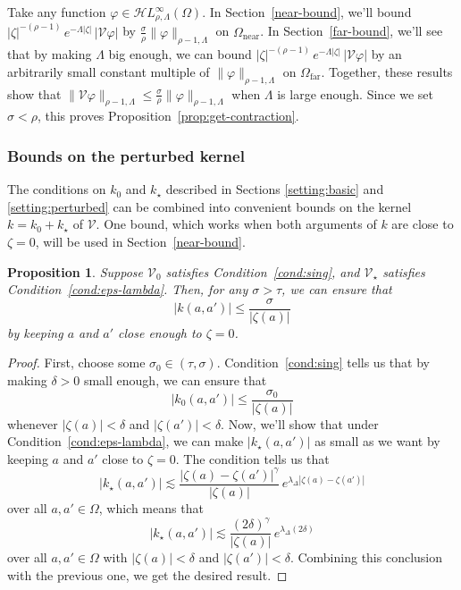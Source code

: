 \documentclass{article}
\theoremstyle{definition}
\theoremstyle{plain}
\newtheorem{prop}{Proposition}
\newcommand{\singexp}[2]{\mathcal{H}L^\infty_{#1, #2}}
\newcommand{\volterra}{\mathcal{V}}
\newcommand{\hardpart}{\mathcal{V}_0}
\newcommand{\softpart}{\mathcal{V}_\star}
\newcommand{\kerwhole}{k}
\newcommand{\hardker}{k_0}
\newcommand{\softker}{k_\star}
\newcommand{\domain}{\Omega}
\newcommand{\near}{\Omega_\text{near}}
\newcommand{\far}{\Omega_\text{far}}
\begin{document}
Take any function $\varphi \in \singexp{\rho}{\Lambda}(\domain)$. In Section~\ref{near-bound}, we'll bound $|\zeta|^{-(\rho-1)}\,e^{-\Lambda|\zeta|}\,|\volterra\varphi|$ by $\tfrac{\sigma}{\rho} \|\varphi\|_{\rho-1, \Lambda}$ on $\near$. In Section~\ref{far-bound}, we'll see that by making $\Lambda$ big enough, we can bound $|\zeta|^{-(\rho-1)}\,e^{-\Lambda|\zeta|}\,|\volterra\varphi|$ by an arbitrarily small constant multiple of $\|\varphi\|_{\rho-1, \Lambda}$ on $\far$. Together, these results show that $\|\volterra \varphi\|_{\rho-1, \Lambda} \le \tfrac{\sigma}{\rho} \|\varphi\|_{\rho-1, \Lambda}$ when $\Lambda$ is large enough. Since we set $\sigma < \rho$, this proves Proposition~\ref{prop:get-contraction}.
\subsubsection{Bounds on the perturbed kernel}\label{sec:bounds on k}
The conditions on $\hardker$ and $\softker$ described in Sections \ref{setting:basic} and \ref{setting:perturbed} can be combined into convenient bounds on the kernel $\kerwhole = \hardker + \softker$ of $\volterra$. One bound, which works when both arguments of $\kerwhole$ are close to $\zeta = 0$, will be used in Section~\ref{near-bound}.
\begin{prop}\label{prop:whole-ker-near-bound}
Suppose $\hardpart$ satisfies Condition~\eqref{cond:sing}, and $\softpart$ satisfies Condition~\eqref{cond:eps-lambda}. Then, for any $\sigma > \tau$, we can ensure that
\[ |\kerwhole(a, a')| \le \frac{\sigma}{|\zeta(a)|} \]
by keeping $a$ and $a'$ close enough to $\zeta = 0$.
\end{prop}
\begin{proof}
First, choose some $\sigma_0 \in (\tau, \sigma)$. Condition~\eqref{cond:sing} tells us that by making $\delta > 0$ small enough, we can ensure that
\[ |\hardker(a, a')| \le \frac{\sigma_0}{|\zeta(a)|} \]
whenever $|\zeta(a)| < \delta$ and $|\zeta(a')| < \delta$. Now, we'll show that under Condition~\eqref{cond:eps-lambda}, we can make $|\softker(a, a')|$ as small as we want by keeping $a$ and $a'$ close to $\zeta = 0$. The condition tells us that
\[ | \softker(a, a') | \lesssim\frac{|\zeta(a)-\zeta(a')|^\gamma}{|\zeta(a)|}\,e^{\lambda_\Delta|\zeta(a)-\zeta(a')|}\]
over all $a, a' \in \domain$, which means that
\[ | \softker(a, a') | \lesssim\frac{(2\delta)^\gamma}{|\zeta(a)|}\,e^{\lambda_\Delta(2\delta)}\]
over all $a, a' \in \domain$ with $|\zeta(a)| < \delta$ and $|\zeta(a')| < \delta$. Combining this conclusion with the previous one, we get the desired result.
\end{proof}
\end{document}
